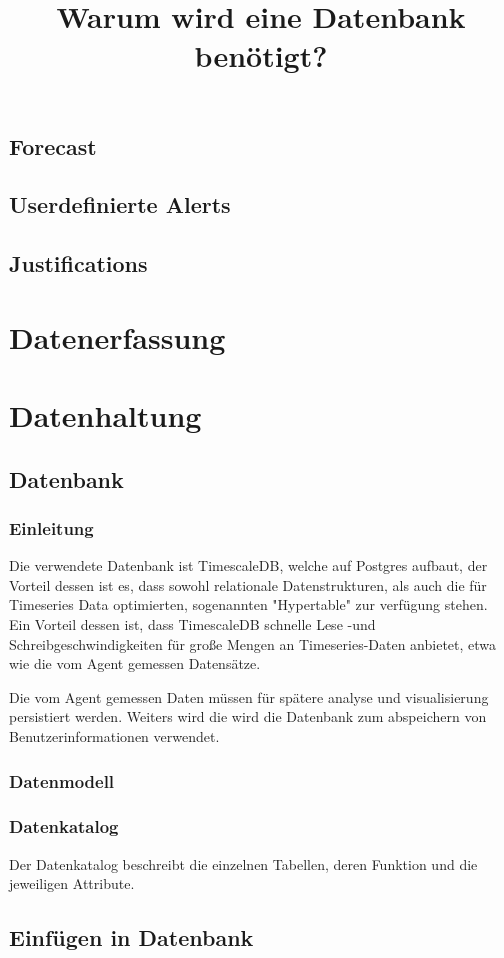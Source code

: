 \documentclass{report}
\begin{document}
\subsection{Forecast}
\subsection{Userdefinierte Alerts}
\subsection{Justifications}
\section{Datenerfassung}
\section{Datenhaltung}
\subsection{Datenbank}
\subsubsection{Einleitung}
Die verwendete Datenbank ist TimescaleDB, welche auf Postgres aufbaut, der Vorteil dessen ist es, dass sowohl relationale Datenstrukturen, als auch die für Timeseries Data optimierten, sogenannten "Hypertable" zur verfügung stehen. Ein Vorteil dessen ist, dass TimescaleDB schnelle Lese -und Schreibgeschwindigkeiten für große Mengen an Timeseries-Daten anbietet, etwa wie die vom Agent gemessen Datensätze.

\title{Warum wird eine Datenbank benötigt?}
Die vom Agent gemessen Daten müssen für spätere analyse und visualisierung persistiert werden. Weiters wird die wird die Datenbank zum abspeichern von Benutzerinformationen verwendet.

\subsubsection{Datenmodell}
\subsubsection{Datenkatalog}
Der Datenkatalog beschreibt die einzelnen Tabellen, deren Funktion und die jeweiligen Attribute.
\subsection{Einfügen in Datenbank}
\end{document}

